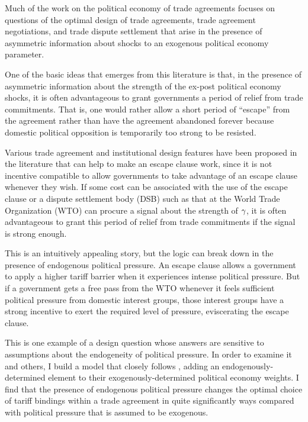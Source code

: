 Much of the work on the political economy of trade agreements focuses on questions of the optimal design of trade agreements, trade agreement negotiations, and trade dispute settlement that arise in the presence of asymmetric information about shocks to an exogenous political economy parameter. 

One of the basic ideas that emerges from this literature is that, in the presence of asymmetric information about the strength of the ex-post political economy shocks, it is often advantageous to grant governments a period of relief from trade commitments. That is, one would rather allow a short period of ``escape'' from the agreement rather than have the agreement abandoned forever because domestic political opposition is temporarily too strong to be resisted.

Various trade agreement and institutional design features have been proposed in the literature that can help to make an escape clause work, since it is not incentive compatible to allow governments to take advantage of an escape clause whenever they wish. If some cost can be associated with the use of the escape clause or a dispute settlement body (DSB) such as that at the World Trade Organization (WTO) can procure a signal about the strength of $\gamma$, it is often advantageous to grant this period of relief from trade commitments if the signal is strong enough. 


This is an intuitively appealing story, but the logic can break down in the presence of endogenous political pressure. An escape clause allows a government to apply a higher tariff barrier when it experiences intense political pressure. But if a government gets a free pass from the WTO whenever it feels sufficient political pressure from domestic interest groups, those interest groups have a strong incentive to exert the required level of pressure, eviscerating the escape clause.

This is one example of a design question whose answers are sensitive to assumptions about the endogeneity of political pressure. In order to examine it and others, I build a model that closely follows \Textcite{bs2005}, adding an endogenously-determined element to their exogenously-determined political economy weights. I find that the presence of endogenous political pressure changes the optimal choice of tariff bindings within a trade agreement in quite significantly ways compared with political pressure that is assumed to be exogenous. 

